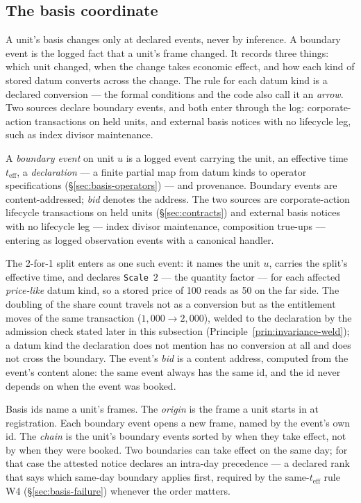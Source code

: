 \subsection{The basis coordinate}
\label{sec:basis-coordinate}

A unit's basis changes only at declared events, never by inference. A boundary
event is the logged fact that a unit's frame changed. It records three things:
which unit changed, when the change takes economic effect, and how each kind of
stored datum converts across the change. The rule for each datum kind is a
declared conversion --- the formal conditions and the code also call it an
\emph{arrow}. Two sources declare boundary events, and both enter through the
log: corporate-action transactions on held units, and external basis notices
with no lifecycle leg, such as index divisor maintenance.

\begin{definition}
\label{def:boundary-event}
A \emph{boundary event} on unit $u$ is a logged event carrying the unit, an effective
time $t_{\mathrm{eff}}$, a \emph{declaration} --- a finite partial map from datum kinds
to operator specifications (\S\ref{sec:basis-operators}) --- and provenance. Boundary
events are content-addressed; \emph{bid} denotes the address. The two sources are
corporate-action lifecycle transactions on held units (\S\ref{sec:contracts}) and
external basis notices with no lifecycle leg --- index divisor maintenance, composition
true-ups --- entering as logged observation events with a canonical handler.
\end{definition}

The 2-for-1 split enters as one such event: it names the unit $u$, carries the
split's effective time, and declares \texttt{Scale}~$2$ --- the quantity factor ---
for each affected \emph{price-like} datum kind, so a stored price of 100 reads as 50
on the far side. The doubling of the share count travels not as a conversion but as
the entitlement moves of the same transaction ($1{,}000\to2{,}000$), welded to the
declaration by the admission check stated later in this subsection
(Principle~\ref{prin:invariance-weld}); a datum kind the declaration does not
mention has no conversion at all and does not cross the boundary. The event's
\emph{bid} is a content address, computed from the event's content alone: the same
event always has the same id, and the id never depends on when the event was booked.

Basis ids name a unit's frames. The \emph{origin} is the frame a unit starts in
at registration. Each boundary event opens a new frame, named by the event's
own id. The \emph{chain} is the unit's boundary events sorted by when they take
effect, not by when they were booked. Two boundaries can take effect on the
same day; for that case the attested notice declares an intra-day precedence
--- a declared rank that says which same-day boundary applies first, required
by the same-$t_{\mathrm{eff}}$ rule W4 (\S\ref{sec:basis-failure}) whenever the
order matters.

